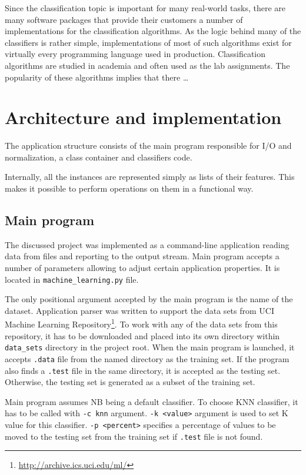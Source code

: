 \documentclass{llncs}
\begin{document}

Since the classification topic is important for many real-world tasks, there are many software packages that provide their customers a number of implementations for the classification algorithms. As the logic behind many of the classifiers is rather simple, implementations of most of such algorithms exist for virtually every programming language used in production. Classification algorithms are studied in academia and often used as the lab assignments. The popularity of these algorithms implies that there \ldots

\section{Architecture and implementation}

The application structure consists of the main program responsible for I/O and normalization, a class container and classifiers code. 

Internally, all the instances are represented simply as lists of their features. This makes it possible to perform operations on them in a functional way.

\subsection{Main program}

The discussed project was implemented as a command-line application reading data from files and reporting to the output stream. Main program accepts a number of parameters allowing to adjust certain application properties. It is located in \lstinline{machine_learning.py} file.

The only positional argument accepted by the main program is the name of the dataset. Application parser was written to support the data sets from UCI Machine Learning Repository\footnote{\url{http://archive.ics.uci.edu/ml/}}. To work with any of the data sets from this repository, it has to be downloaded and placed into its own directory within \lstinline{data_sets} directory in the project root. When the main program is launched, it accepts \lstinline{.data} file from the named directory as the training set. If the program also finds a \lstinline{.test} file in the same directory, it is accepted as the testing set. Otherwise, the testing set is generated as a subset of the training set.

Main program assumes NB being a default classifier. To choose KNN classifier, it has to be called with \lstinline{-c knn} argument. \lstinline{-k <value>} argument is used to set K value for this classifier. \lstinline{-p <percent>} specifies a percentage of values to be moved to the testing set from the training set if \lstinline{.test} file is not found.
\end{document}
